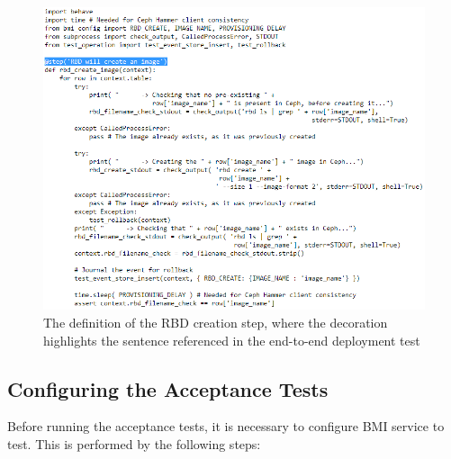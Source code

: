\begin{figure}[!h] 
\begin{center}
\includegraphics[scale=1]{figures/bmi-bdd-step-definition-v3.png}
\end{center}
\caption{The definition of the RBD creation step, where the decoration highlights the sentence referenced in the end-to-end deployment test}
\label{fig:bdd-bmi-function-definition}
\end{figure}
\text{}\vspace{10mm}
\pagebreak

\subsection{Configuring the Acceptance Tests  \\ }

Before running the acceptance tests, it is necessary to configure BMI service to test.  This is performed by the following steps:

